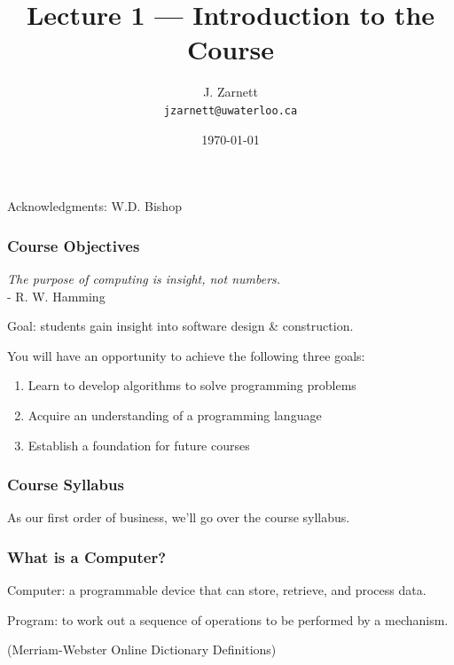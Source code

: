 

\title{Lecture 1 --- Introduction to the Course}

\author{J. Zarnett\\
\texttt{jzarnett@uwaterloo.ca}}
\date{\today}



\begin{frame}
  \titlepage
  
  \begin{center}
  \small{Acknowledgments: W.D. Bishop}
  \end{center}
 \end{frame}
 
\begin{frame}
\frametitle{Course Objectives}

\textit{The purpose of computing is insight, not numbers.}\\
\hfill - R. W. Hamming

Goal: students gain insight into software design \& construction.

You will have an opportunity to achieve the following three goals:
\begin{enumerate}
\item Learn to develop algorithms to solve programming problems
\item Acquire an understanding of a programming language
\item Establish a foundation for future courses
\end{enumerate}

\end{frame}

\begin{frame}
\frametitle{Course Syllabus}
As our first order of business, we'll go over the course syllabus.
\end{frame}

\begin{frame}
\frametitle{What is a Computer?}

\alert{Computer}: a programmable device that can store, retrieve, and process data.

\alert{Program}: to work out a sequence of operations to be performed by a mechanism.

(Merriam-Webster Online Dictionary Definitions)

\end{frame}


